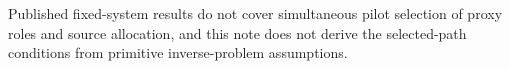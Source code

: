 Published fixed-system results do not cover simultaneous pilot selection of proxy roles and source allocation, and this note does not derive the selected-path conditions from primitive inverse-problem assumptions.
